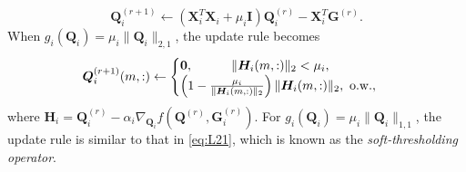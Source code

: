 \documentclass[10pt,journal]{IEEEtran}
\newcommand{\G}{\boldsymbol{G}}
\newcommand{\Q}{\boldsymbol{Q}}
\newcommand{\X}{\boldsymbol{X}}
\begin{document}
\begin{equation}\label{eq:L2}
\Q_i^{(r+1)} \leftarrow ({\bm X}_i^T{\bm X}_i+\mu_i\bm I){\bm Q}_i^{(r)}- {\bm X}_i^T{\bm G}^{(r)}.
\end{equation} 
When $g_i(\Q_i)=\mu_i\|\Q_i\|_{2,1}$, the update rule becomes
\begin{equation}\label{eq:L21}
\Q_i^{(r+1)}(m,:) \leftarrow \begin{cases}
\bm 0, \quad \quad\quad\|\bm H_i(m,:)\|_2 < \mu_i,\\
\left(1 - \frac{\mu_i}{\|\bm H_i(m,:)\|_2}\right)\|\bm H_i(m,:)\|_2,~{\rm o.w.},
\end{cases}
\end{equation}
where $\bm H_i =\Q_i^{(r)}-\alpha_i \nabla_{\Q_i} f\left(\Q^{(r)},\G_i^{(r)}\right)$.
For $g_i(\Q_i)=\mu_i\|\Q_i\|_{1,1}$, the update rule is similar to that in \eqref{eq:L21},
which is known as the \emph{soft-thresholding operator}.
\end{document}
